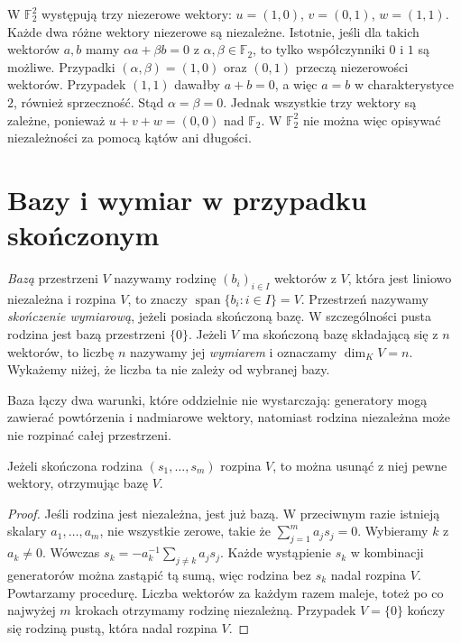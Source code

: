 \begin{przyklad}
\label{prz:lin-f2}
W \(\mathbb F_2^2\) występują trzy niezerowe wektory:
\(u=(1,0)\), \(v=(0,1)\), \(w=(1,1)\).
Każde dwa różne wektory niezerowe są niezależne.
Istotnie, jeśli dla takich wektorów \(a,b\)
mamy \(\alpha a+\beta b=0\) z
\(\alpha,\beta\in\mathbb F_2\), to tylko
współczynniki \(0\) i \(1\) są możliwe.
Przypadki \((\alpha,\beta)=(1,0)\)
oraz \((0,1)\) przeczą niezerowości
wektorów. Przypadek \((1,1)\)
dawałby \(a+b=0\), a więc \(a=b\)
w charakterystyce \(2\), również sprzeczność.
Stąd \(\alpha=\beta=0\).
Jednak wszystkie trzy wektory są zależne, ponieważ
\(u+v+w=(0,0)\) nad \(\mathbb F_2\).
W \(\mathbb F_2^2\) nie można więc opisywać
niezależności za pomocą kątów ani długości.
\end{przyklad}

\section{Bazy i wymiar w przypadku skończonym}
\label{sec:lin-bazy-skonczone}

\begin{definicja}
\label{def:lin-baza}
\emph{Bazą} przestrzeni \(V\) nazywamy rodzinę
\((b_i)_{i\in I}\) wektorów z \(V\), która jest
liniowo niezależna i rozpina \(V\), to znaczy
\(\operatorname{span}\{b_i:i\in I\}=V\).
Przestrzeń nazywamy \emph{skończenie wymiarową},
jeżeli posiada skończoną bazę.
W szczególności pusta rodzina jest bazą przestrzeni \(\{0\}\).
Jeżeli \(V\) ma skończoną bazę składającą się z \(n\)
wektorów, to liczbę \(n\) nazywamy jej \emph{wymiarem}
i oznaczamy \(\dim_KV=n\).
Wykażemy niżej, że liczba ta nie zależy od wybranej bazy.
\end{definicja}

Baza łączy dwa warunki, które oddzielnie nie wystarczają:
generatory mogą zawierać powtórzenia i nadmiarowe wektory,
natomiast rodzina niezależna może nie rozpinać całej przestrzeni.

\begin{lemat}
\label{lem:lin-usuwanie-generatorow}
Jeżeli skończona rodzina \((s_1,\ldots,s_m)\)
rozpina \(V\), to można usunąć z niej pewne
wektory, otrzymując bazę \(V\).
\end{lemat}
\begin{proof}
Jeśli rodzina jest niezależna, jest już bazą.
W przeciwnym razie istnieją skalary
\(a_1,\ldots,a_m\), nie wszystkie zerowe, takie że
\(\sum_{j=1}^m a_js_j=0\).
Wybieramy \(k\) z \(a_k\neq0\). Wówczas
\(s_k=-a_k^{-1}\sum_{j\neq k}a_js_j\).
Każde wystąpienie \(s_k\) w kombinacji generatorów
można zastąpić tą sumą, więc rodzina bez \(s_k\)
nadal rozpina \(V\). Powtarzamy procedurę.
Liczba wektorów za każdym razem maleje, toteż
po co najwyżej \(m\) krokach otrzymamy rodzinę
niezależną. Przypadek \(V=\{0\}\) kończy się
rodziną pustą, która nadal rozpina \(V\).
\end{proof}

